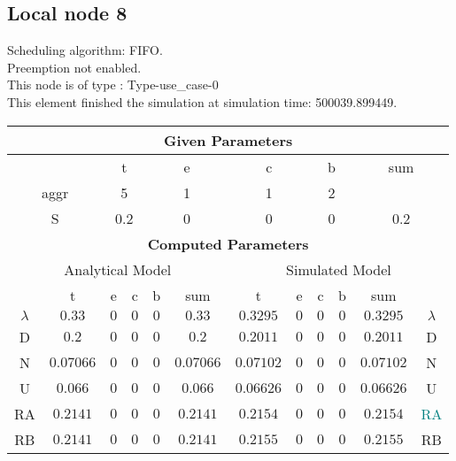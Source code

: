 \documentclass{article}
\begin{document}
\subsection{Local node 8}
Scheduling algorithm: FIFO.\\Preemption not enabled. \\This node is of type : Type-use\_case-0\\
This element finished the simulation at simulation time: 500039.899449.\\
\begin{table}[H]\centering\begin{tabular}{@{}c|cccc|c||cccc|c|c@{}}\toprule\multicolumn{12}{c}{\textbf{Given Parameters}}\\\midrule\multicolumn{2}{c|}{ } & \multicolumn{2}{c}{t} & \multicolumn{2}{c}{e} & \multicolumn{2}{c}{c} & \multicolumn{2}{c}{b} & \multicolumn{2}{|c}{sum} \\\midrule\multicolumn{2}{c|}{aggr} & \multicolumn{2}{c}{5} & \multicolumn{2}{c}{1} & \multicolumn{2}{c}{1} & \multicolumn{2}{c}{2} & \multicolumn{2}{|c}{ } \\ \midrule\multicolumn{2}{c|}{S} & \multicolumn{2}{c}{0.2} & \multicolumn{2}{c}{0} & \multicolumn{2}{c}{0} & \multicolumn{2}{c}{0} & \multicolumn{2}{|c}{0.2}\\ \midrule\midrule\multicolumn{12}{c}{\textbf{Computed Parameters}}\\ \midrule\multicolumn{6}{c||}{Analytical Model} & \multicolumn{6}{c}{Simulated Model}\\ 
 \midrule & t & e & c & b & sum & t & e & c & b & sum &  \\ \midrule$\lambda$ &$0.33$ & $0$ & $0$ & $0$ & $0.33$ & $0.3295$ & $0$ & $0$ & $0$ & $0.3295$& $\lambda$ \\D & $0.2$ & $0$ & $0$ & $0$ & $0.2$ & $0.2011$ & $0$ & $0$ & $0$ & $0.2011$& D\\N & $0.07066$ & $0$ & $0$ & $0$ & $0.07066$ & $0.07102$ & $0$ & $0$ & $0$ & $0.07102$& N\\U & $0.066$ & $0$ & $0$ & $0$ & $0.066$ & $0.06626$ & $0$ & $0$ & $0$ & $0.06626$& U\\RA & $0.2141$ & $0$ & $0$ & $0$ & $0.2141$ & $0.2154$ & $0$ & $0$ & $0$ & $0.2154$& \textcolor{teal}{RA}\\RB & $0.2141$ & $0$ & $0$ & $0$ & $0.2141$ & $0.2155$ & $0$ & $0$ & $0$ & $0.2155$& RB\\
\bottomrule
\end{tabular}
\end{table}
\filbreak
\end{document}

